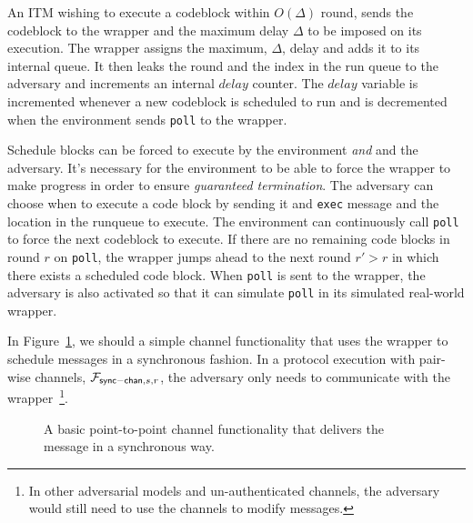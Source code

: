 
An ITM wishing to execute a codeblock within $O(\Delta)$ round, sends the codeblock to the wrapper and the maximum delay $\Delta$ to be imposed on its execution.
The wrapper assigns the maximum, $\Delta$, delay and adds it to its internal queue.
It then leaks the round and the index in the run queue to the adversary and increments an internal $delay$ counter.
The $delay$ variable is incremented whenever a new codeblock is scheduled to run and is decremented when the environment sends \texttt{poll} to the wrapper.

Schedule blocks can be forced to execute by the environment \emph{and} and the adversary.
It's necessary for the environment to be able to force the wrapper to make progress in order to ensure \emph{guaranteed termination}.
The adversary can choose when to execute a code block by sending it and \texttt{exec} message and the location in the runqueue to execute.
The environment can continuously call \texttt{poll} to force the next codeblock to execute.
If there are no remaining code blocks in round $r$ on \texttt{poll}, the wrapper jumps ahead to the next round $r' > r$ in which there exists a scheduled code block.
When \texttt{poll} is sent to the wrapper, the adversary is also activated so that it can simulate \texttt{poll} in its simulated real-world wrapper.

In Figure~\ref{fig:functionality:channel}, we should a simple channel functionality that uses the wrapper to schedule messages in a synchronous fashion.
In a protocol execution with pair-wise channels, $\mathcal{F}_{{\mathsf {sync-chan}},s,r}$, the adversary only needs to communicate with the wrapper~\footnote{In other adversarial models and un-authenticated channels, the adversary would still need to use the channels to modify messages.}.

\begin{figure}
	
	\caption{A basic point-to-point channel functionality that delivers the message in a synchronous way.}
	\label{fig:functionality:channel}
\end{figure}

